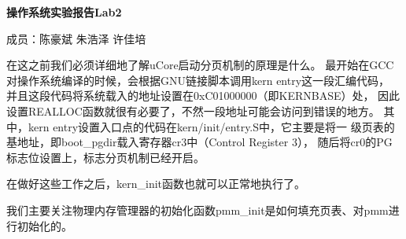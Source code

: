 \documentclass[UTF8, a4paper]{ctexart}
\begin{document}
\centerline{\textbf{\LARGE{操作系统实验报告Lab2}}}
\bigskip
\centerline{\large{成员：陈豪斌 \quad 朱浩泽 \quad 许佳培}}
\bigskip
    在这之前我们必须详细地了解uCore启动分页机制的原理是什么。
    最开始在GCC对操作系统编译的时候，会根据GNU链接脚本调用kern entry这一段汇编代码，
    并且这段代码将系统载入的地址设置在0xC01000000（即KERNBASE）处，
    因此设置REALLOC函数就很有必要了，不然一段地址可能会访问到错误的地方。
    其中，kern entry设置入口点的代码在kern/init/entry.S中，它主要是将一
    级页表的基地址，即boot\_pgdir载入寄存器cr3中（Control Register 3），
    随后将cr0的PG标志位设置上，标志分页机制已经开启。
    \par 
    在做好这些工作之后，kern\_init函数也就可以正常地执行了。
    \bigskip
    \par 
    我们主要关注物理内存管理器的初始化函数pmm\_init是如何填充页表、对pmm进行初始化的。
\end{document}
